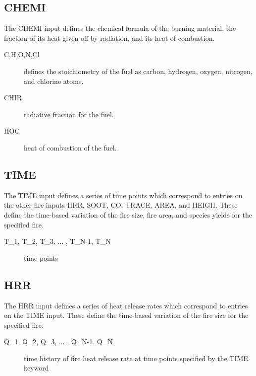 \subsection{CHEMI}

The CHEMI input defines the chemical formula of the burning material, the fraction of its heat given off by radiation, and its heat of combustion.

\begin{adjustwidth}{1cm}{0cm}
\begin{description}
  \item[C,H,O,N,Cl] defines the stoichiometry of the fuel as carbon, hydrogen, oxygen, nitrogen, and chlorine atoms.
  \item[CHIR] radiative fraction for the fuel.
  \item[HOC] heat of combustion of the fuel.
\end{description}
\end{adjustwidth}

\subsection{TIME}

The TIME input defines a series of time points which correspond to entries on the other fire inputs HRR, SOOT, CO, TRACE, AREA, and HEIGH.  These define the time-based variation of the fire size, fire area, and species yields for the specified fire.

\begin{adjustwidth}{1cm}{0cm}
\begin{description}
  \item[T\_1, T\_2, T\_3, ... , T\_N-1, T\_N] time points
\end{description}
\end{adjustwidth}

\subsection{HRR}

The HRR input defines a series of heat release rates which correspond to entries on the TIME input.  These define the time-based variation of the fire size for the specified fire.

\begin{adjustwidth}{1cm}{0cm}
\begin{description}
  \item[Q\_1, Q\_2, Q\_3, ... , Q\_N-1, Q\_N] time history of fire heat release rate at time points specified by the TIME keyword
\end{description}
\end{adjustwidth}

